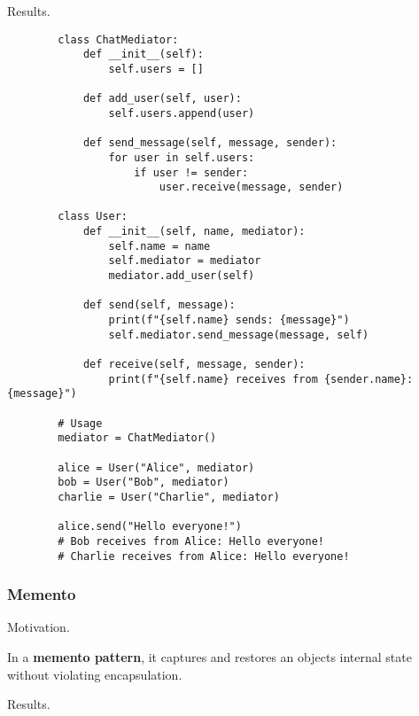     Results. 

    \begin{example}
      \begin{lstlisting}
        class ChatMediator:
            def __init__(self):
                self.users = []
            
            def add_user(self, user):
                self.users.append(user)
            
            def send_message(self, message, sender):
                for user in self.users:
                    if user != sender:
                        user.receive(message, sender)

        class User:
            def __init__(self, name, mediator):
                self.name = name
                self.mediator = mediator
                mediator.add_user(self)
            
            def send(self, message):
                print(f"{self.name} sends: {message}")
                self.mediator.send_message(message, self)
            
            def receive(self, message, sender):
                print(f"{self.name} receives from {sender.name}: {message}")

        # Usage
        mediator = ChatMediator()

        alice = User("Alice", mediator)
        bob = User("Bob", mediator)
        charlie = User("Charlie", mediator)

        alice.send("Hello everyone!")
        # Bob receives from Alice: Hello everyone!
        # Charlie receives from Alice: Hello everyone! 
      \end{lstlisting}
    \end{example}

  \subsubsection{Memento}

    Motivation. 

    \begin{definition}[Memento]
      In a \textbf{memento pattern}, it captures and restores an objects internal state without violating encapsulation. 
    \end{definition}

    Results. 


